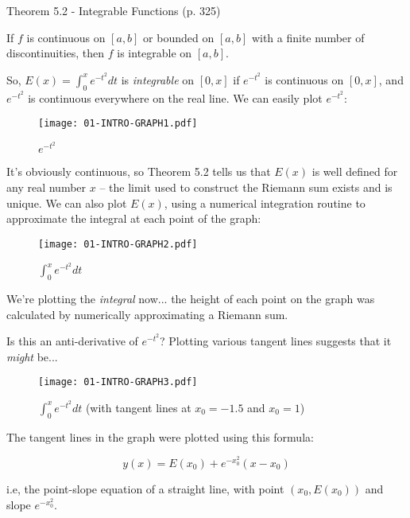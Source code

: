 \begin{framed}
Theorem 5.2 - Integrable Functions (p. 325)

If $f$ is continuous on $[a,b]$ or bounded on $[a,b]$ with a finite number of discontinuities,
then $f$ is integrable on $[a,b]$.
\end{framed}

So, $E(x) = \int_0^x e^{-t^2} dt$ is {\it integrable} on $[0,x]$ if $e^{-t^2}$ is continuous on $[0,x]$,
and $e^{-t^2}$ is continuous everywhere on the real line.  We can easily plot $e^{-t^2}$:

\begin{figure}[H]
\begin{center}
\texttt{[image: 01-INTRO-GRAPH1.pdf]}
\end{center}
\caption{$e^{-t^2}$}
\end{figure}

It's obviously continuous, so Theorem 5.2 tells us that $E(x)$ is well
defined for any real number $x$ -- the limit used to construct the
Riemann sum exists and is unique.  We can also plot $E(x)$, using a
numerical integration routine to approximate the integral at each
point of the graph:

\begin{figure}[H]
\begin{center}
\texttt{[image: 01-INTRO-GRAPH2.pdf]}
\end{center}
\caption{$\int_0^x e^{-t^2} dt$}
\end{figure}

We're plotting the {\it integral} now... the height of each point on the graph
was calculated by numerically approximating a Riemann sum.

Is this an anti-derivative of $e^{-t^2}$?  Plotting various tangent lines suggests
that it {\it might} be...

\begin{figure}[H]
\begin{center}
\texttt{[image: 01-INTRO-GRAPH3.pdf]}
\end{center}
\caption{$\int_0^x e^{-t^2} dt$ (with tangent lines at $x_0=-1.5$ and $x_0=1$)}
\end{figure}

The tangent lines in the graph were plotted using this formula:

$$ y(x) = E(x_0) + e^{-x_0^2}(x-x_0)$$

i.e, the point-slope equation of a straight line, with point $(x_0, E(x_0))$ and slope $e^{-x_0^2}$.

